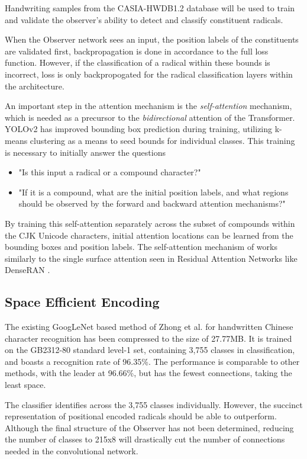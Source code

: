 Handwriting samples from the CASIA-HWDB1.2 database \cite{casia-handwriting-db} will be used to train and validate the observer's ability to detect and classify constituent radicals.

When the Observer network sees an input, the position labels of the constituents are validated first, backpropagation is done in accordance to the full loss function. However, if the classification of a radical within these bounds is incorrect, loss is only backpropogated for the radical classification layers within the architecture.

An important step in the attention mechanism is the \textit{self-attention} mechanism, which is needed as a precursor to the \textit{bidirectional} attention of the Transformer. YOLOv2 has improved bounding box prediction during training, utilizing k-means clustering as a means to seed bounds for individual classes\cite{yolo}. This training is necessary to initially answer the questions

\begin{itemize}
    \item "Is this input a radical or a compound character?"
    \item "If it is a compound, what are the initial position labels, and what regions should be observed by the forward and backward attention mechanisms?"
\end{itemize}

By training this self-attention separately across the subset of compounds within the CJK Unicode characters, initial attention locations can be learned from the bounding boxes and position labels. The self-attention mechanism of works similarly to the single surface attention seen in Residual Attention Networks \cite {residual-attention} like DenseRAN \cite{denseran}.

\subsection{Space Efficient Encoding}
The existing GoogLeNet based method of Zhong et al. for handwritten Chinese character recognition has been compressed to the size of 27.77MB\cite{hccr-googlenet}. It is trained on the GB2312-80 standard level-1 set, containing 3,755 classes in classification, and boasts a recognition rate of 96.35\%. The performance is comparable to other methods, with the leader at 96.66\%\cite{denseran}, but has the fewest connections, taking the least space.

The classifier identifies across the 3,755 classes individually. However, the succinct representation of positional encoded radicals should be able to outperform. Although the final structure of the Observer has not been determined, reducing the number of classes to 215x8 will drastically cut the number of connections needed in the convolutional network.

